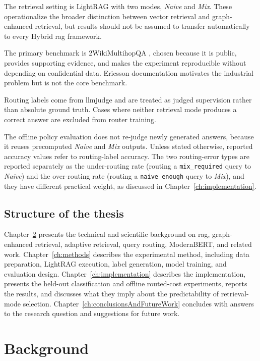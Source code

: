 \documentclass[english, bibtex]{kththesis}               %
\numberwithin{listing}{chapter}
\begin{document}
The retrieval setting is LightRAG with two modes, \emph{Naive} and \emph{Mix}. These operationalize the broader distinction between vector retrieval and graph-enhanced retrieval, but results should not be assumed to transfer automatically to every Hybrid \gls{rag} framework.

The primary benchmark is 2WikiMultihopQA \cite{ho2020twowiki}, chosen because it is public, provides supporting evidence, and makes the experiment reproducible without depending on confidential data. Ericsson documentation motivates the industrial problem but is not the core benchmark.

Routing labels come from \gls{llmjudge} and are treated as judged supervision rather than absolute ground truth. Cases where neither retrieval mode produces a correct answer are excluded from router training.

The offline policy evaluation does not re-judge newly generated answers, because it reuses precomputed \emph{Naive} and \emph{Mix} outputs. Unless stated otherwise, reported accuracy values refer to routing-label accuracy. The two routing-error types are reported separately as the under-routing rate (routing a \texttt{mix\_required} query to \emph{Naive}) and the over-routing rate (routing a \texttt{naive\_enough} query to \emph{Mix}), and they have different practical weight, as discussed in Chapter~\ref{ch:implementation}.

\section{Structure of the thesis}
\label{sec:structure}

Chapter~\ref{ch:background} presents the technical and scientific background on \gls{rag}, graph-enhanced retrieval, adaptive retrieval, query routing, ModernBERT, and related work. Chapter~\ref{ch:methods} describes the experimental method, including data preparation, LightRAG execution, label generation, model training, and evaluation design. Chapter~\ref{ch:implementation} describes the implementation, presents the held-out classification and offline routed-cost experiments, reports the results, and discusses what they imply about the predictability of retrieval-mode selection. Chapter~\ref{ch:conclusionsAndFutureWork} concludes with answers to the research question and suggestions for future work.

\cleardoublepage
\chapter{Background}
\label{ch:background}
\end{document}
